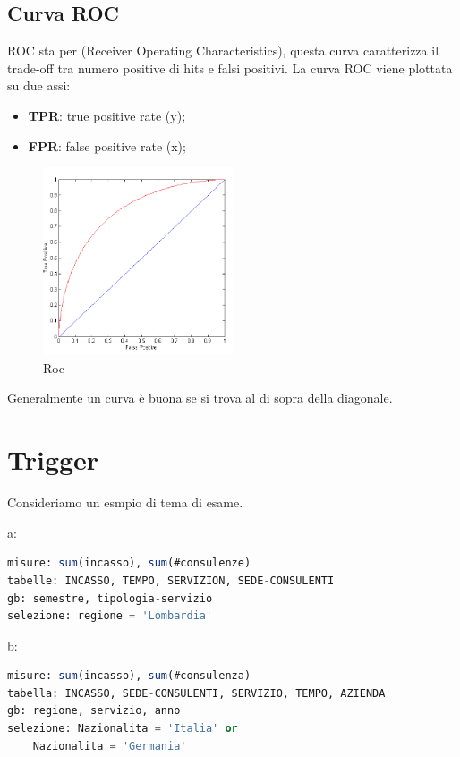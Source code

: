 \documentclass[12pt]{article}
\begin{document}
\subsection{Curva ROC}
ROC sta per (Receiver Operating Characteristics), questa curva caratterizza il trade-off tra numero positive di hits e falsi positivi. La curva ROC viene plottata su due assi:
\begin{itemize}
    \item \textbf{TPR}: true positive rate (y);
    \item \textbf{FPR}: false positive rate (x);
\end{itemize}
\begin{figure}[H]
    \centering
    \includegraphics[width=0.5\textwidth]{roc.png}
    \caption{Roc}
    \label{fig:roc}
\end{figure}
Generalmente un curva \`e buona se si trova al di sopra della diagonale.



\newpage
\section{Trigger}
Consideriamo un esmpio di tema di esame.

a:
\begin{lstlisting}[language=sql]
misure: sum(incasso), sum(#consulenze)
tabelle: INCASSO, TEMPO, SERVIZION, SEDE-CONSULENTI
gb: semestre, tipologia-servizio
selezione: regione = 'Lombardia'
\end{lstlisting}

b:
\begin{lstlisting}[language=sql]
misure: sum(incasso), sum(#consulenza)
tabella: INCASSO, SEDE-CONSULENTI, SERVIZIO, TEMPO, AZIENDA
gb: regione, servizio, anno
selezione: Nazionalita = 'Italia' or
    Nazionalita = 'Germania'
\end{lstlisting}
\end{document}
